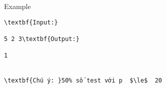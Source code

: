 Example
\begin{verbatim}
\textbf{Input:}

5 2 3\textbf{Output:}

1


\textbf{Chú ý: }50% số test với p  $\le$  20
\end{verbatim}